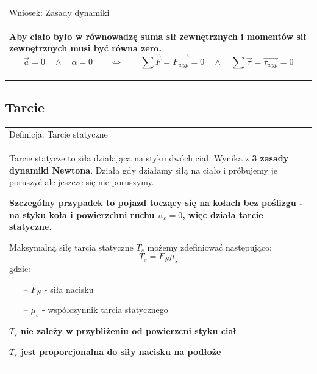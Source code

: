 \documentclass[a4paper]{article}
\newenvironment{definition}[2][Definicja]
    {
        \begin{center}
        \begin{tabular}{|p{1\textwidth}|}
        \hline
            #1: #2\\[2ex]
        \begin{em}
        \Large
    }
    { 
        \end{em}
        \\\hline
        \end{tabular} 
        \end{center}
    }
\begin{document}
    \begin{definition}[Wniosek]{Zasady dynamiki}
        \textbf{Aby ciało było w równowadzę suma sił zewnętrznych i momentów sił zewnętrznych
        musi być równa zero.}
        \[\vec{a} = \bar{0} \quad\land\quad \alpha = 0 \qquad\iff\qquad 
        \sum \vec{F} = \vec{F_{wyp}} = \bar{0}
        \quad\land\quad \sum \vec{\tau} = \vec{\tau_{wyp}} = \bar{0} \]
    \end{definition}

    \subsection{\LARGE Tarcie}
    \begin{definition}{Tarcie statyczne}
        Tarcie statycze to siła działająca na styku dwóch ciał. Wynika z \textbf{3 zasady dynamiki
        Newtona}. Działa gdy działamy siłą na ciało i próbujemy je poruszyć ale jeszcze się nie poruszymy.
        
        \textbf{Szczególny przypadek to pojazd toczący się na kołach bez poślizgu - na styku koła i powierzchni ruchu $v_w = 0$, więc działa tarcie
        statyczne.} 

        Maksymalną siłę tarcia statyczne $T_s$ możemy zdefiniować następująco:
        \[T_s = F_N{\mu_s}\]
        gdzie:
        \begin{itemize}
            \item[--] $F_N$ - siła nacisku
            \item[--] $\mu_s$ - współczynnik tarcia statycznego
        \end{itemize}

        \textbf{$T_s$ nie zależy w przybliżeniu od powierzcni styku ciał}

        \textbf{$T_s$ jest proporcjonalna do siły nacisku na podłoże}
    \end{definition}
\end{document}
